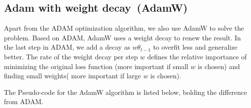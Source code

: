 \subsection{Adam with weight decay\ (AdamW)}

Apart from the ADAM optimization algorithm, we also use AdamW to solve the problem. Based on ADAM, AdamW uses a weight decay to renew the result. In the last step in ADAM, we add a decay as $w \theta_{t-1} $ to overfit less and generalize better. The rate of the weight decay per step $w$ defines the relative importance of minimizing the original loss function (more important if small $w$ is chosen) and finding small weights( more important if large $w$ is chosen).

The Pseudo-code for the AdamW algorithm is listed below, bolding the difference from ADAM.


